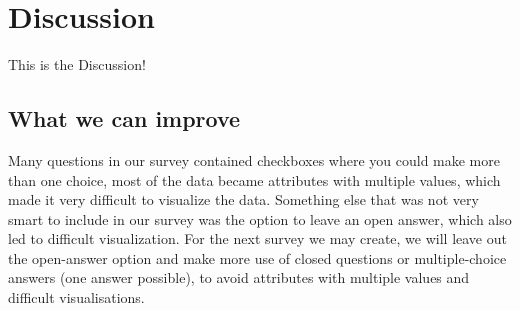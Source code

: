 \section{Discussion}
This is the Discussion!

\subsection{What we can improve}
Many questions in our survey contained checkboxes where you could make more than one choice, most of the data became attributes with multiple values, which made it very difficult to visualize the data. Something else that was not very smart to include in our survey was the option to leave an open answer, which also led to difficult visualization. For the next survey we may create, we will leave out the open-answer option and make more use of closed questions or multiple-choice answers (one answer possible), to avoid attributes with multiple values and difficult visualisations.